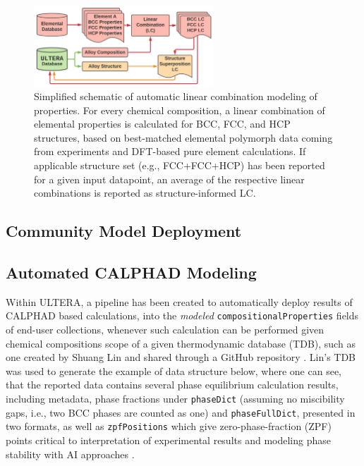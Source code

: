 \begin{figure}[H]
    \centering
    \includegraphics[width=0.6\textwidth]{ultera/ULTERA_ElementalDatabase_LC_V1.png}
    \caption{Simplified schematic of automatic linear combination modeling of properties. For every chemical composition, a linear combination of elemental properties is calculated for BCC, FCC, and HCP structures, based on best-matched elemental polymorph data coming from experiments and DFT-based pure element calculations. If applicable structure set (e.g., FCC+FCC+HCP) has been reported for a given input datapoint, an average of the respective linear combinations is reported as structure-informed LC.}
    \label{ultera:fig:autolc}
\end{figure}




\subsection{Community Model Deployment} \label{ultera:ssec:communitymodels}

\todo




\subsection{Automated CALPHAD Modeling} \label{ultera:ssec:autocalphad}

Within ULTERA, a pipeline has been created to automatically deploy results of CALPHAD \cite{Olson2023GenomicDynamics} based calculations, into the \emph{modeled} \texttt{compositionalProperties} fields of end-user collections, whenever such calculation can be performed given chemical compositions scope of a given thermodynamic database (TDB), such as one created by Shuang Lin and shared through a GitHub repository \cite{LinShuangLin212/refractory-elements-database:ZR}. Lin's TDB was used to generate the example of data structure below, where one can see, that the reported data contains several phase equilibrium calculation results, including metadata, phase fractions under \texttt{phaseDict} (assuming no miscibility gaps, i.e., two BCC phases are counted as one) and \texttt{phaseFullDict}, presented in two formats, as well as \texttt{zpfPositions} which give zero-phase-fraction (ZPF) points critical to interpretation of experimental results \cite{Li2024DesignExperiments} and modeling phase stability with AI approaches \cite{Wu2023EstimatingApproach}.

